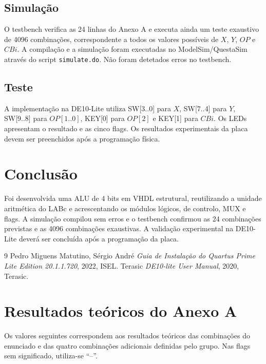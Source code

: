 \documentclass[12pt]{article}
\begin{document}
\subsection{Simulação}
O testbench verifica as 24 linhas do Anexo A e executa ainda um teste
exaustivo de 4096 combinações, correspondente a todos os valores possíveis
de $X$, $Y$, $OP$ e $CBi$. A compilação e a simulação foram executadas no
ModelSim/QuestaSim através do script \texttt{simulate.do}. Não foram
detetados erros no testbench.

\subsection{Teste}
A implementação na DE10-Lite utiliza SW[3..0] para $X$, SW[7..4] para
$Y$, SW[9..8] para $OP[1..0]$, KEY[0] para $OP[2]$ e KEY[1] para $CBi$.
Os LEDs apresentam o resultado e as cinco flags. Os resultados
experimentais da placa devem ser preenchidos após a programação física.

\section{Conclusão} 
Foi desenvolvida uma ALU de 4 bits em VHDL estrutural, reutilizando a
unidade aritmética do LABc e acrescentando os módulos lógicos, de controlo,
MUX e flags. A simulação compilou sem erros e o testbench confirmou as
24 combinações previstas e as 4096 combinações exaustivas. A validação
experimental na DE10-Lite deverá ser concluída após a programação da placa.

\clearpage
\begin{thebibliography}{9}
Pedro Miguens Matutino, Sérgio André \emph{Guia de Instalação do Quartus Prime Lite Edition 20.1.1.720}, 2022, ISEL.
Terasic \emph{DE10-lite User Manual}, 2020, Terasic.
\end{thebibliography}


\clearpage
\appendix
\section{Resultados teóricos do Anexo A}
Os valores seguintes correspondem aos resultados teóricos das combinações
do enunciado e das quatro combinações adicionais definidas pelo grupo.
Nas flags sem significado, utiliza-se ``--''.
\end{document}

